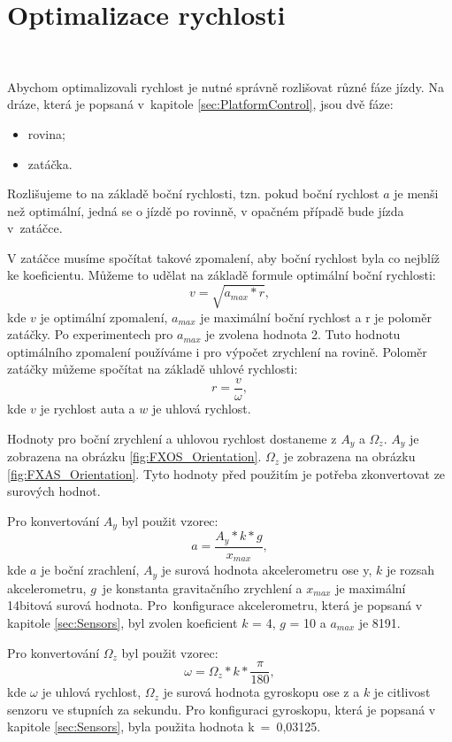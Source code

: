 \chapter{Optimalizace rychlosti}
\label{sec:SpeedOptimization}
\

Abychom optimalizovali rychlost je nutné správně rozlišovat různé fáze jízdy. Na
dráze, která je popsaná v~kapitole \ref{sec:PlatformControl}, jsou dvě fáze:
\begin{itemize}
	\item{rovina;}
	\item{zatáčka.}
\end{itemize}

Rozlišujeme to na základě boční rychlosti, tzn. pokud boční rychlost $a$ je menši než
optimální, jedná se o jízdě po rovinně, v opačném případě bude jízda v~zatáčce.

V zatáčce musíme spočítat takové zpomalení, aby boční rychlost byla
co nejblíž ke koeficientu. Můžeme to udělat na základě formule optimální boční
rychlosti:
\begin{equation}
v = \sqrt{a_{max} * r},
\end{equation}
kde $v$ je optimální zpomalení, $a_{max}$ je maximální boční rychlost a r je poloměr
zatáčky. Po experimentech pro $a_{max}$ je zvolena hodnota 2. Tuto hodnotu
optimálního zpomalení používáme i pro výpočet zrychlení na rovině. Poloměr zatáčky můžeme
spočítat na základě uhlové rychlosti:
\begin{equation}
r = \frac{v}{\omega},
\end{equation}
kde $v$ je rychlost auta a $w$ je uhlová rychlost.

Hodnoty pro boční zrychlení a uhlovou rychlost dostaneme z $A_y$ a $\Omega_z$. $A_y$ je
zobrazena na obrázku \ref{fig:FXOS_Orientation}. $\Omega_z$ je zobrazena na obrázku
\ref{fig:FXAS_Orientation}.
Tyto hodnoty před použitím je potřeba zkonvertovat ze surových
hodnot.

Pro konvertování $A_y$ byl použit vzorec:
\begin{equation}
a = \frac{A_y * k * g}{x_{max}},
\end{equation}
kde $a$ je boční zrachlení, $A_y$ je surová hodnota akcelerometru ose y,
$k$ je rozsah akcelerometru,  $g$~je konstanta gravitačního zrychlení a $x_{max}$ je
maximální 14bitová surová hodnota.  Pro~konfigurace akcelerometru, která je popsaná v kapitole
\ref{sec:Sensors}, byl zvolen koeficient $k$ = 4, $g$ = 10 a $a_{max}$ je 8191.

Pro konvertování $\Omega_z$ byl použit vzorec:
\begin{equation}
\omega = \Omega_z * k * \frac{\pi}{180},
\end{equation}
kde $\omega$ je uhlová rychlost, $\Omega_z$ je surová hodnota gyroskopu ose z
a $k$ je citlivost senzoru ve stupních za sekundu.
Pro konfiguraci gyroskopu, která je popsaná v kapitole
\ref{sec:Sensors}, byla použita hodnota k~=~0,03125.

\endinput
